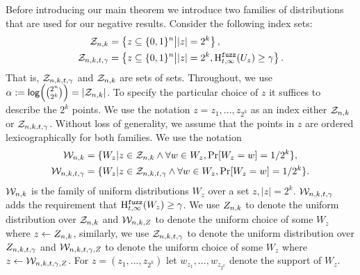 
\label{sec:family}
Before introducing our main theorem we introduce two families of distributions that are used for our negative results.  Consider the following index sets:
\begin{align*}
\mathcal{Z}_{n,k} &=\left\{z \subseteq \{0, 1\}^n\middle|  |z| = 2^k\right\},\\
\mathcal{Z}_{n,k,t,\gamma} &= \left\{z \subseteq \{0, 1\}^n\middle| |z| = 2^k,\mathrm{H}^{\mathtt{fuzz}}_{t,\infty}(U_z) \ge \gamma\right\}.
\end{align*}
That is, $\mathcal{Z}_{n,k,t,\gamma}$ and $\mathcal{Z}_{n,k}$ are sets of sets.  Throughout, we use $\alpha:= \mathsf{log}\!\left({2^n\choose 2^k}\right) = |\mathcal{Z}_{n,k}|$. To specify the particular choice of $z$ it suffices to describe the $2^k$ points.  We use the notation $z = z_{1},..., z_{2^k}$ as an index either $\mathcal{Z}_{n,k}$ or $\mathcal{Z}_{n,k,t,\gamma}$. Without loss of generality, we assume that the points in $z$ are ordered lexicographically for both families.  
We use the notation 
\begin{align*}
\mathcal{W}_{n,k} &=\{W_z | z \in \mathcal{Z}_{n,k}  \wedge \forall w \in W_z, \Pr[W_z=w]=1/2^k\},\\
\mathcal{W}_{n,k,t,\gamma} &= \{W_z | z\in \mathcal{Z}_{n,k,t,\gamma} \wedge \forall w \in W_z, \Pr[W_z=w]=1/2^k\}.
\end{align*}
$\mathcal{W}_{n,k}$ is the family of uniform distributions $W_z$ over a set $z, |z|=2^k$.
$\mathcal{W}_{n,k,t,\gamma}$ adds the requirement that $\mathrm{H}^{\mathtt{fuzz}}_{t,\infty}(W_z)\ge\gamma$. We use $Z_{n,k}$ to denote the uniform distribution over $\mathcal{Z}_{n,k}$ and $\mathcal{W}_{n,k, Z}$ to denote the uniform choice of some $W_z$ where $z\leftarrow Z_{n,k}$, similarly, we use $\mathcal{Z}_{n,k,t,\gamma}$ to denote the uniform distribution over $Z_{n,k,t,\gamma}$ and $\mathcal{W}_{n,k,t,\gamma, Z}$ to denote the uniform choice of some $W_z$ where $z\leftarrow \mathcal{W}_{n,k,t,\gamma, Z}$. For $z=(z_1,..., z_{2^k})$ let $w_{z_1},..., w_{z_{2^k}}$ denote the support of $W_z$.
